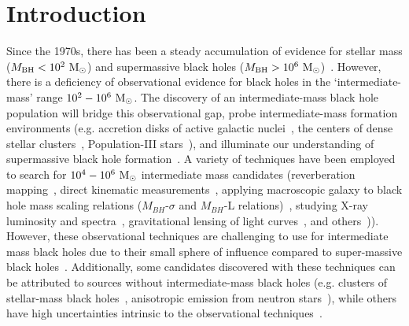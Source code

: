 \documentclass[%
 nofootinbib,
 amsmath,amssymb,
 aps,
 twocolumn,
 superscriptaddress
]{revtex4-2}
\newcommand{\mathcmd}[1]{{\sc \relax\ifmmode#1\else $#1$\fi}\xspace}
\newcommand{\msun}{\mathcmd{\text{M}_\odot}}
\begin{document}
\section{Introduction}
Since the 1970s, there has been a steady accumulation of evidence for stellar mass ($M_\text{BH} < 10^{2} \ \msun$) and supermassive black holes ($M_\text{BH} > 10^{6} \ \msun$)~\cite{Webster:1972:Natur, Balick:1974:ApJ, Ghez:1998:ApJ, Genzel:2010:RvMP, Abbott:2019:PhRvX, EventHorizonTelescopeCollaboration:2019:ApJL, Abbott:2020:arXiv}.  However, there is a deficiency of observational evidence for black holes in the `intermediate-mass' range $10^{2} - 10^{6}\ \msun$. The discovery of an intermediate-mass black hole population will bridge this observational gap, probe intermediate-mass formation environments (e.g. accretion disks of active galactic nuclei~\cite{Tagawa:2021:ApJ, Li:2021:arXiv, Samsing:2020:arXiv, Tagawa:2020:ApJ, Ishibashi:2020:A&A, Grobner:2020:A&A, Yang:2019:PhRvL, McKernan:2019:ApJL, Yang:2019:ApJ, McKernan:2018:ApJ, Bellovary:2016:ApJL, McKernan:2014:MNRAS, McKernan:2012:MNRAS}, the centers of dense stellar clusters~\cite{Banerjee:2021:MNRASa, Zevin:2021:ApJ,Mapelli:2021:arXiv,Weatherford:2021:ApJL, Bouffanais:2021:arXiv, Ballone:2021:MNRAS, Kumamoto:2021:arXiv, Banerjee:2021:MNRASb, Martinez:2020:ApJ, Romero-Shaw:2020:ApJL, Anagnostou:2020:PASA}, Population-III stars~\cite{Toubiana:2021:PhRvL, Farrell:2021:MNRAS, Safarzadeh:2020:ApJL, Liu:2020:MNRAS, Inayoshi:2017:MNRAS}), and illuminate our understanding of supermassive black hole formation~\cite{Askar:2021:MNRAS, ArcaSedda:2019:arXiv, Amaro-Seoane:2007:CQGra, Gurkan:2006:ApJL}. A variety of techniques have been employed to search for $10^{4} - 10^{6}\ \msun$ intermediate mass candidates (reverberation mapping~\cite{Peterson:2014:SSRv}, direct kinematic measurements~\cite{Schodel:2002:Natur, Kiziltan:2017:Natur}, applying macroscopic galaxy to black hole mass scaling relations ($M_{BH}$-$\sigma$ and $M_{BH}$-L relations)~\cite{Graham:2013:ApJ, Wevers:2017:MNRAS}, studying  X-ray luminosity and spectra~\cite{Greene:2004:ApJ, Lin:2020:ApJL}, gravitational lensing of light curves~\cite{paynter_evidence_2021}, and others~\cite{Greene:2020:ARA&A, Koliopanos:2017:mbhe, Mezcua:2017:IJMPD})). However, these observational techniques are challenging to use for intermediate mass black holes due to their small sphere of influence compared to super-massive black holes~\cite{Mezcua:2017:IJMPD}. Additionally, some candidates discovered with these techniques can be attributed to sources without intermediate-mass black holes (e.g. clusters of stellar-mass black holes~\cite{Ridolfi:2016:MNRAS, Freire:2017:MNRAS}, anisotropic emission from neutron stars~\cite{Israel:2017:MNRAS, RodriguezCastillo:2020:ApJ}), while others have high uncertainties intrinsic to the observational techniques~\cite{Greene:2020:ARA&A}. 
\end{document}
